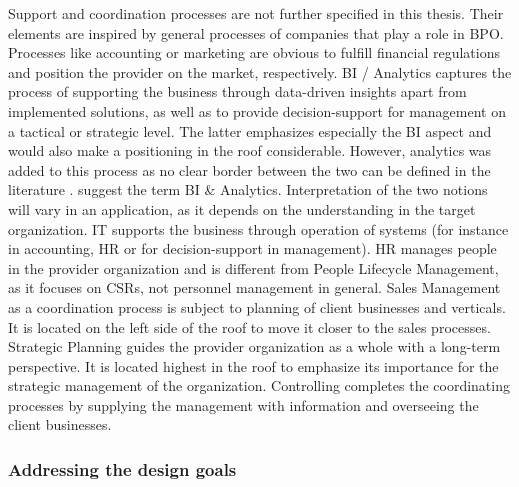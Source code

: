 	 Support and coordination processes are not further specified in this thesis. Their elements are inspired by general processes of companies that play a role in \acrshort{BPO}. Processes like accounting or marketing are obvious to fulfill financial regulations and position the provider on the market, respectively. \acrfull{BI} / Analytics captures the process of supporting the business through data-driven insights apart from implemented solutions, as well as to provide decision-support for management on a tactical or strategic level. The latter emphasizes especially the  \acrshort{BI} aspect and would also make a positioning in the roof considerable. However, analytics was added to this process as no clear border between the two can be defined in the literature  \citep{mertens}. \citep{Chen:2012:BIA} suggest the term \acrshort{BI} \& Analytics. Interpretation of the two notions will vary in an application, as it depends on the understanding in the target organization. IT supports the business through operation of systems (for instance in accounting, HR or for decision-support in management). HR manages people in the provider organization and is different from People Lifecycle Management, as it focuses on \acrshort{CSR}s, not personnel management in general. Sales Management as a coordination process is subject to planning of client businesses and verticals. It is located on the left side of the roof to move it closer to the sales processes. Strategic Planning guides the provider organization as a whole with a long-term perspective. It is located highest in the roof to emphasize its importance for the strategic management of the organization. Controlling completes the coordinating processes by supplying the management with information and overseeing the client businesses. 
	 	 
	 \subsubsection{Addressing  the design goals}
	 
